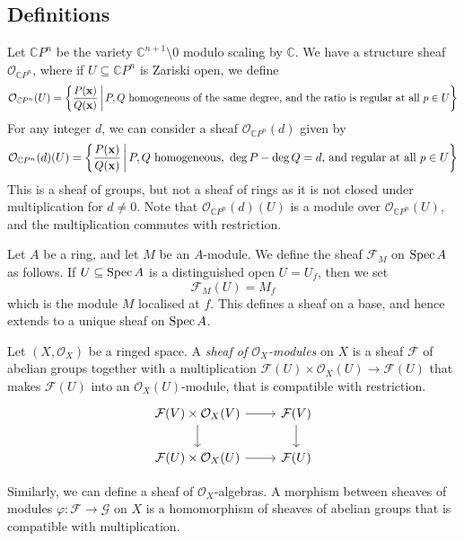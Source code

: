 \subsection{Definitions}
\begin{example}
    Let \( \mathbb CP^n \) be the variety \( \mathbb C^{n+1} \setminus \qty{0} \) modulo scaling by \( \mathbb C \).
    We have a structure sheaf \( \mathcal O_{\mathbb CP^n} \), where if \( U \subseteq \mathbb CP^n \) is Zariski open, we define
    \[ \mathcal O_{\mathbb CP^n}(U) = \qty{\frac{P(\vb x)}{Q(\vb x)} \,\middle|\,P, Q \text{ homogeneous of the same degree, and the ratio is regular at all } p \in U} \]
    For any integer \( d \), we can consider a sheaf \( \mathcal O_{\mathbb CP^n}(d) \) given by
    \[ \mathcal O_{\mathbb CP^n}(d)(U) = \qty{\frac{P(\vb x)}{Q(\vb x)} \,\middle|\,P, Q \text{ homogeneous, } \deg P - \deg Q = d\text{, and regular at all } p \in U} \]
    This is a sheaf of groups, but not a sheaf of rings as it is not closed under multiplication for \( d \neq 0 \).
    Note that \( \mathcal O_{\mathbb CP^n}(d)(U) \) is a module over \( \mathcal O_{\mathbb CP^n}(U) \), and the multiplication commutes with restriction.
\end{example}
\begin{example}
    Let \( A \) be a ring, and let \( M \) be an \( A \)-module.
    We define the sheaf \( \mathcal F_M \) on \( \operatorname{Spec} A \) as follows.
    If \( U \subseteq \operatorname{Spec} A \) is a distinguished open \( U = U_f \), then we set
    \[ \mathcal F_M(U) = M_f \]
    which is the module \( M \) localised at \( f \).
    This defines a sheaf on a base, and hence extends to a unique sheaf on \( \operatorname{Spec} A \).
\end{example}
\begin{definition}
    Let \( (X, \mathcal O_X) \) be a ringed space.
    A \emph{sheaf of \( \mathcal O_X \)-modules} on \( X \) is a sheaf \( \mathcal F \) of abelian groups together with a multiplication \( \mathcal F(U) \times \mathcal O_X(U) \to \mathcal F(U) \) that makes \( \mathcal F(U) \) into an \( \mathcal O_X(U) \)-module, that is compatible with restriction.
\[\begin{tikzcd}
	{\mathcal F(V) \times \mathcal O_X(V)} & {\mathcal F(V)} \\
	{\mathcal F(U) \times \mathcal O_X(U)} & {\mathcal F(U)}
	\arrow[from=1-1, to=1-2]
	\arrow[from=1-2, to=2-2]
	\arrow[from=1-1, to=2-1]
	\arrow[from=2-1, to=2-2]
\end{tikzcd}\]
\end{definition}
Similarly, we can define a sheaf of \( \mathcal O_X \)-algebras.
A morphism between sheaves of modules \( \varphi : \mathcal F \to \mathcal G \) on \( X \) is a homomorphism of sheaves of abelian groups that is compatible with multiplication.
